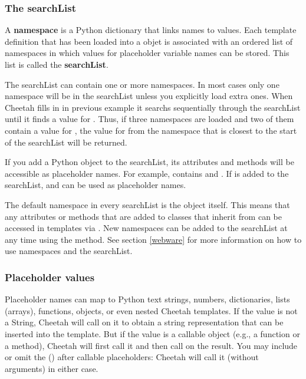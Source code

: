 \subsubsection{The searchList}
A {\bf namespace} is a Python dictionary that links names to values. Each
template definition that has been loaded into a  objet is
associated with an ordered list of namespaces in which values for placeholder
variable names can be stored.  This list is called the {\bf searchList}.

The searchList can contain one or more namespaces.  In most cases only one
namespace will be in the searchList unless you explicitly load extra ones.  When
Cheetah fills in  in previous example it searchs
sequentially through the searchList until it finds a value for .
Thus, if three namespaces are loaded and two of them contain a value for
, the value for  from the namespace that is
closest to the start of the searchList will be returned.

If you add a Python object to the searchList, its attributes and methods will be
accessible as placeholder names.  For example,  contains
 and .  If  is added to the
searchList,  and  can be used as placeholder
names.  

The default namespace in every searchList is the  object itself.
This means that any attributes or methods that are added to classes that inherit
from  can be accessed in templates via .  New
namespaces can be added to the searchList at any time using the
 method.  See section \ref{webware} for more
information on how to use namespaces and the searchList.

\subsubsection{Placeholder values}

Placeholder names can map to Python text strings, numbers, dictionaries, lists
(arrays), functions, objects, or even nested Cheetah templates.  If the value is
not a String, Cheetah will call  on it to obtain a string
representation that can be inserted into the template.  But if the value is a
callable object (e.g., a function or a method), Cheetah will first call it and
then call  on the result.  You may include or omit the () after
callable placeholders: Cheetah will call it (without arguments) in either case.


